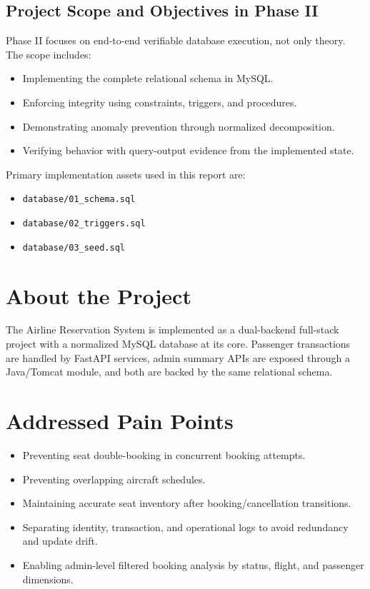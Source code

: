 \documentclass[12pt, a4paper]{article}
\begin{document}
\subsection{Project Scope and Objectives in Phase II}
Phase II focuses on end-to-end verifiable database execution, not only theory. The scope includes:
\begin{itemize}
    \item Implementing the complete relational schema in MySQL.
    \item Enforcing integrity using constraints, triggers, and procedures.
    \item Demonstrating anomaly prevention through normalized decomposition.
    \item Verifying behavior with query-output evidence from the implemented state.
\end{itemize}

Primary implementation assets used in this report are:
\begin{itemize}
    \item \texttt{database/01\_schema.sql}
    \item \texttt{database/02\_triggers.sql}
    \item \texttt{database/03\_seed.sql}
\end{itemize}

\section{About the Project}
The Airline Reservation System is implemented as a dual-backend full-stack project with a normalized MySQL database at its core. Passenger transactions are handled by FastAPI services, admin summary APIs are exposed through a Java/Tomcat module, and both are backed by the same relational schema.

\section{Addressed Pain Points}
\begin{itemize}
    \item Preventing seat double-booking in concurrent booking attempts.
    \item Preventing overlapping aircraft schedules.
    \item Maintaining accurate seat inventory after booking/cancellation transitions.
    \item Separating identity, transaction, and operational logs to avoid redundancy and update drift.
    \item Enabling admin-level filtered booking analysis by status, flight, and passenger dimensions.
\end{itemize}
\end{document}
